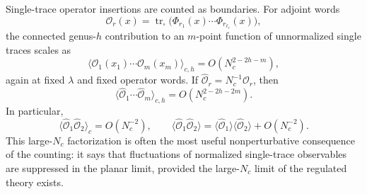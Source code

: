 Single-trace operator insertions are counted as boundaries.  For adjoint words
\[
  \mathcal O_r(x)
  =
  \operatorname{tr}_{\square}
  \bigl(\Phi_{r_1}(x)\cdots \Phi_{r_{\ell_r}}(x)\bigr),
\]
the connected genus-\(h\) contribution to an \(m\)-point function of
unnormalized single traces scales as
\begin{equation}
  \bigl\langle
  \mathcal O_1(x_1)\cdots \mathcal O_m(x_m)
  \bigr\rangle_{\!c,h}
  =
  O\!\left(N_c^{2-2h-m}\right),
  \label{eq:qcd-large-n-single-trace-scaling}
\end{equation}
again at fixed \(\lambda\) and fixed operator words.  If
\(\widehat{\mathcal O}_r=N_c^{-1}\mathcal O_r\), then
\[
  \bigl\langle
  \widehat{\mathcal O}_1\cdots \widehat{\mathcal O}_m
  \bigr\rangle_{\!c,h}
  =
  O\!\left(N_c^{2-2h-2m}\right).
\]
In particular,
\begin{equation}
  \bigl\langle
  \widehat{\mathcal O}_1\widehat{\mathcal O}_2
  \bigr\rangle_c
  =
  O(N_c^{-2}),
  \qquad
  \langle \widehat{\mathcal O}_1\widehat{\mathcal O}_2\rangle
  =
  \langle \widehat{\mathcal O}_1\rangle
  \langle \widehat{\mathcal O}_2\rangle+O(N_c^{-2}).
  \label{eq:qcd-large-n-factorization}
\end{equation}
This large-\(N_c\) factorization is often the most useful nonperturbative
consequence of the counting: it says that fluctuations of normalized
single-trace observables are suppressed in the planar limit, provided the
large-\(N_c\) limit of the regulated theory exists.

